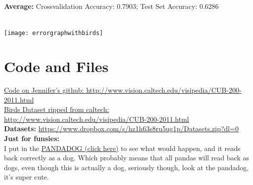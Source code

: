 \documentclass{article}
\begin{document}
	\textbf{Average:} Crossvalidation Accuracy: 0.7903;  Test Set Accuracy: 0.6286
	\\ \\

	\centerline{\texttt{[image: errorgraphwithbirds]}}

	\section{Code and Files}
	\setlength\parindent{34pt} \href{https://github.com/jenncheung/Advance-Machine-Learning-Project}{Code on Jennifer's github: http://www.vision.caltech.edu/visipedia/CUB-200-2011.html} \\
	\href{http://www.vision.caltech.edu/visipedia/CUB-200-2011.html}{Birds Dataset ripped from caltech: http://www.vision.caltech.edu/visipedia/CUB-200-2011.html}\\
	\textbf{Datasets:} \href{https://www.dropbox.com/s/hz1h63s8ru5ug1p/Datasets.zip?dl=0}{https://www.dropbox.com/s/hz1h63s8ru5ug1p/Datasets.zip?dl=0}\\
	\textbf{Just for funsies:} \\
	I put in the \href{http://guardianlv.com/wp-content/uploads/2014/05/The-Panda-Dog-Is-the-Newest-Rage-in-China.jpg}{PANDADOG (click here)} to see what would happen, and it reads back correctly as a dog.  Which probably means that all pandas will read back as dogs, even though this is actually a dog, seriously though, look at the pandadog, it's super cute.
\end{document}
